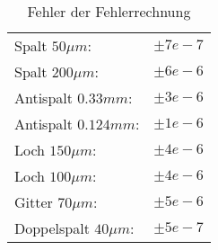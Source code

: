 \begin{table}[H]
	\centering
	\begin{tabular}{ll}
		Spalt $50\mu m$:		&  $\pm7e-7$\\
		Spalt $200\mu m$:		&  $\pm6e-6$\\
		Antispalt $0.33mm$: 	&  $\pm3e-6$\\
		Antispalt $0.124mm$:	&  $\pm1e-6$\\
		Loch $150\mu m$: 		&  $\pm4e-6$\\
		Loch $100\mu m$: 		&  $\pm4e-6$\\
		Gitter $70\mu m$:  		&  $\pm5e-6$\\
		Doppelspalt $40\mu m$: 	&  $\pm5e-7$\\
	\end{tabular}
	\caption{Fehler der Fehlerrechnung}
	\label{tab:final_values_error}
\end{table}